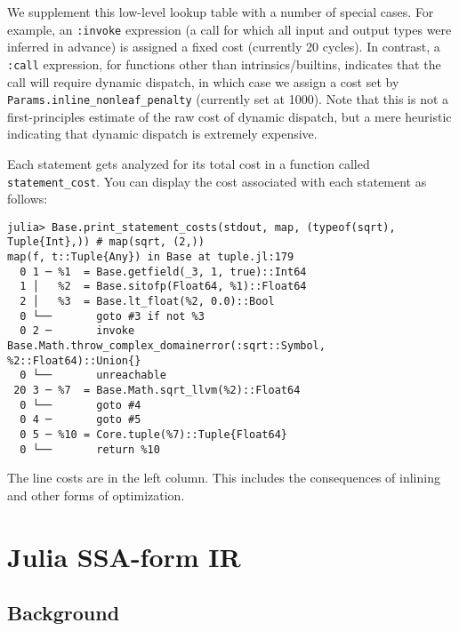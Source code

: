 We supplement this low-level lookup table with a number of special cases. For example, an \texttt{:invoke} expression (a call for which all input and output types were inferred in advance) is assigned a fixed cost (currently 20 cycles). In contrast, a \texttt{:call} expression, for functions other than intrinsics/builtins, indicates that the call will require dynamic dispatch, in which case we assign a cost set by \texttt{Params.inline\_nonleaf\_penalty} (currently set at 1000). Note that this is not a {\textquotedbl}first-principles{\textquotedbl} estimate of the raw cost of dynamic dispatch, but a mere heuristic indicating that dynamic dispatch is extremely expensive.



Each statement gets analyzed for its total cost in a function called \texttt{statement\_cost}. You can display the cost associated with each statement as follows:




\begin{verbatim}
julia> Base.print_statement_costs(stdout, map, (typeof(sqrt), Tuple{Int},)) # map(sqrt, (2,))
map(f, t::Tuple{Any}) in Base at tuple.jl:179
  0 1 ─ %1  = Base.getfield(_3, 1, true)::Int64
  1 │   %2  = Base.sitofp(Float64, %1)::Float64
  2 │   %3  = Base.lt_float(%2, 0.0)::Bool
  0 └──       goto #3 if not %3
  0 2 ─       invoke Base.Math.throw_complex_domainerror(:sqrt::Symbol, %2::Float64)::Union{}
  0 └──       unreachable
 20 3 ─ %7  = Base.Math.sqrt_llvm(%2)::Float64
  0 └──       goto #4
  0 4 ─       goto #5
  0 5 ─ %10 = Core.tuple(%7)::Tuple{Float64}
  0 └──       return %10
\end{verbatim}



The line costs are in the left column. This includes the consequences of inlining and other forms of optimization.



\hypertarget{16468279497102584880}{}


\section{Julia SSA-form IR}



\hypertarget{5370755282098388224}{}


\subsection{Background}



